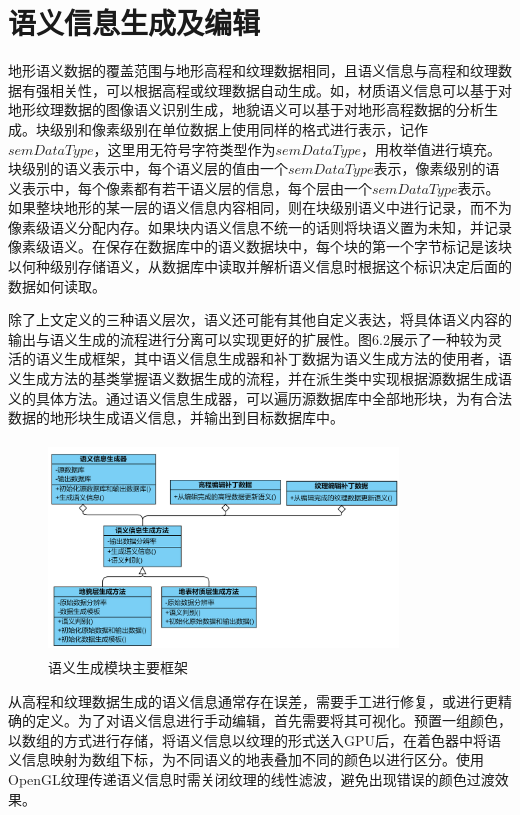 \section{语义信息生成及编辑}
地形语义数据的覆盖范围与地形高程和纹理数据相同，且语义信息与高程和纹理数据有强相关性，可以根据高程或纹理数据自动生成。如，材质语义信息可以基于对地形纹理数据的图像语义识别生成，地貌语义可以基于对地形高程数据的分析生成。块级别和像素级别在单位数据上使用同样的格式进行表示，记作$semDataType$，这里用无符号字符类型作为$semDataType$，用枚举值进行填充。块级别的语义表示中，每个语义层的值由一个$semDataType$表示，像素级别的语义表示中，每个像素都有若干语义层的信息，每个层由一个$semDataType$表示。如果整块地形的某一层的语义信息内容相同，则在块级别语义中进行记录，而不为像素级语义分配内存。如果块内语义信息不统一的话则将块语义置为未知，并记录像素级语义。在保存在数据库中的语义数据块中，每个块的第一个字节标记是该块以何种级别存储语义，从数据库中读取并解析语义信息时根据这个标识决定后面的数据如何读取。\par
除了上文定义的三种语义层次，语义还可能有其他自定义表达，将具体语义内容的输出与语义生成的流程进行分离可以实现更好的扩展性。图6.2展示了一种较为灵活的语义生成框架，其中语义信息生成器和补丁数据为语义生成方法的使用者，语义生成方法的基类掌握语义数据生成的流程，并在派生类中实现根据源数据生成语义的具体方法。通过语义信息生成器，可以遍历源数据库中全部地形块，为有合法数据的地形块生成语义信息，并输出到目标数据库中。
\begin{figure}[H]
    \centering
   \includegraphics[height=5.6cm,width=9.3cm]{figures/semanticGen.png}
    \caption{语义生成模块主要框架}
\end{figure}
从高程和纹理数据生成的语义信息通常存在误差，需要手工进行修复，或进行更精确的定义。为了对语义信息进行手动编辑，首先需要将其可视化。预置一组颜色，以数组的方式进行存储，将语义信息以纹理的形式送入GPU后，在着色器中将语义信息映射为数组下标，为不同语义的地表叠加不同的颜色以进行区分。使用OpenGL纹理传递语义信息时需关闭纹理的线性滤波，避免出现错误的颜色过渡效果。\par
